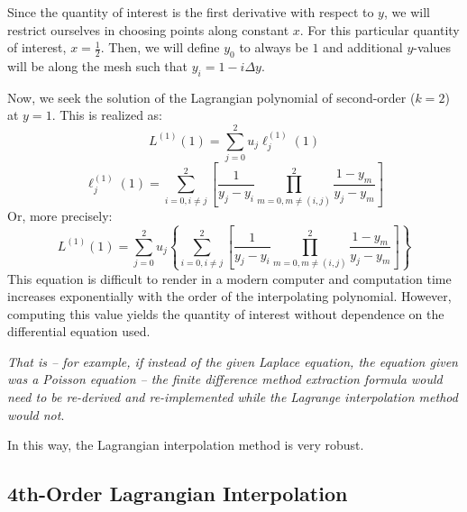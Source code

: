 \documentclass[10pt]{article}		%
\numberwithin{equation}{section}
\begin{document}
Since the quantity of interest is the first derivative with respect to $y$, we will restrict ourselves in choosing points along constant $x$. For this particular quantity of interest, $x=\tfrac{1}{2}$. Then, we will define $y_0$ to always be $1$ and additional $y$-values will be along the mesh such that $y_i = 1-i\Delta y$.

Now, we seek the solution of the Lagrangian polynomial of second-order ($k=2$) at $y=1$. This is realized as:
\begin{equation}
L^{(1)}(1) = \sum_{j=0}^{2} u_j \ell_j^{(1)}(1)
\end{equation}
\begin{equation}
\ell_j^{(1)}(1) = \sum_{i=0, i\not=j}^2 \left[ \frac{1}{y_j-y_i}\prod_{m=0,m\not = (i , j)}^2 \frac{1-y_m}{y_j-y_m} \right]
\end{equation}
Or, more precisely:
\begin{equation}
L^{(1)}(1) = \sum_{j=0}^{2} u_j \left\{ \sum_{i=0, i\not=j}^2 \left[ \frac{1}{y_j-y_i}\prod_{m=0,m\not = (i , j)}^2 \frac{1-y_m}{y_j-y_m} \right] \right\}
\end{equation}
This equation is difficult to render in a modern computer and computation time increases exponentially with the order of the interpolating polynomial. However, computing this value yields the quantity of interest without dependence on the differential equation used. 

\textit{That is -- for example, if instead of the given Laplace equation, the equation given was a Poisson equation -- the finite difference method extraction formula would need to be re-derived and re-implemented while the Lagrange interpolation method would not}.

In this way, the Lagrangian interpolation method is very robust.

\newpage

\subsection{4th-Order Lagrangian Interpolation}
\end{document}
